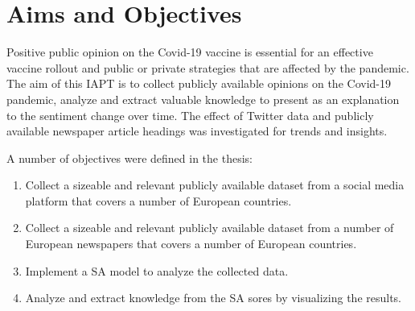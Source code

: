 %
%

\section{Aims and Objectives}

Positive public opinion on the Covid-19 vaccine is essential for an effective vaccine rollout and public or private strategies that are affected by the pandemic.
The aim of this \acs{IAPT} is to collect publicly available opinions on the Covid-19 pandemic, analyze and extract valuable knowledge to present as an explanation to the sentiment change over time.
The effect of Twitter data and publicly available newspaper article headings was investigated for trends and insights.

A number of objectives were defined in the thesis:

\begin{enumerate}
  \item Collect a sizeable and relevant publicly available dataset from a social media platform that covers a number of European countries.
  \item Collect a sizeable and relevant publicly available dataset from a number of European newspapers that covers a number of European countries.
  \item Implement a \acs{SA} model to analyze the collected data.
  \item Analyze and extract knowledge from the \acs{SA} sores by visualizing the results.
\end{enumerate}

